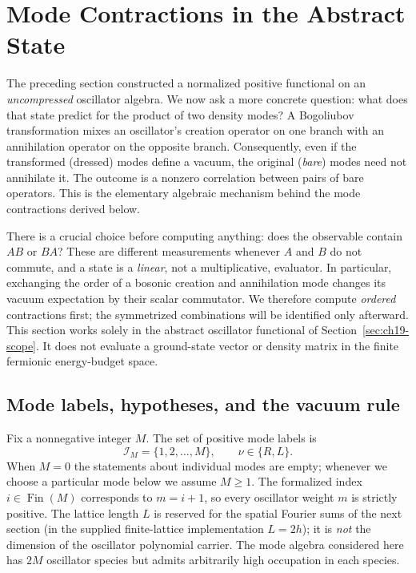 \section{Mode Contractions in the Abstract State}
\label{sec:ch19-mode-correlators}

The preceding section constructed a normalized positive functional on an
\emph{uncompressed} oscillator algebra. We now ask a more concrete question:
what does that state predict for the product of two density modes? A
Bogoliubov transformation mixes an oscillator's creation operator on one
branch with an annihilation operator on the opposite branch. Consequently,
even if the transformed (dressed) modes define a vacuum, the original
(\emph{bare}) modes need not annihilate it. The outcome is a nonzero
correlation between pairs of bare operators. This is the elementary
algebraic mechanism behind the mode contractions derived below.

There is a crucial choice before computing anything: does the observable
contain $AB$ or $BA$? These are different measurements whenever $A$ and
$B$ do not commute, and a state is a \emph{linear}, not a multiplicative,
evaluator. In particular, exchanging the order of a bosonic creation and
annihilation mode changes its vacuum expectation by their scalar
commutator. We therefore compute \emph{ordered} contractions first; the
symmetrized combinations will be identified only afterward. This section
works solely in the abstract oscillator functional of
Section~\ref{sec:ch19-scope}. It does not evaluate a ground-state vector
or density matrix in the finite fermionic energy-budget space.

\subsection{Mode labels, hypotheses, and the vacuum rule}

Fix a nonnegative integer $M$. The set of positive mode labels is
\[
  \mathcal{I}_M=\{1,2,\ldots,M\},
  \qquad \nu\in\{R,L\}.
\]
When $M=0$ the statements about individual modes are empty; whenever we
choose a particular mode below we assume $M\geq1$. The formalized index
$i\in\operatorname{Fin}(M)$ corresponds to $m=i+1$, so every oscillator
weight $m$ is strictly positive. The lattice length $L$ is reserved for
the spatial Fourier sums of the next section (in the supplied finite-lattice
implementation $L=2h$); it is \emph{not} the dimension of the oscillator
polynomial carrier. The mode algebra considered here has $2M$ oscillator
species but admits arbitrarily high occupation in each species.

